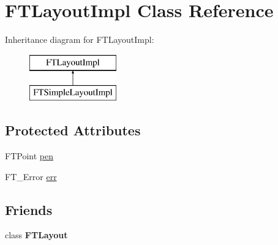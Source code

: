 \hypertarget{class_f_t_layout_impl}{\section{F\-T\-Layout\-Impl Class Reference}
\label{class_f_t_layout_impl}
}
Inheritance diagram for F\-T\-Layout\-Impl\-:\begin{figure}[H]
\begin{center}
\leavevmode
\includegraphics[height=2.000000cm]{class_f_t_layout_impl}
\end{center}
\end{figure}
\subsection*{Protected Attributes}
\begin{DoxyCompactItemize}
\item 
F\-T\-Point \hyperlink{class_f_t_layout_impl_aefaff875c0cf4fe5710897f614be44ac}{pen}
\item 
F\-T\-\_\-\-Error \hyperlink{class_f_t_layout_impl_af3c9ad6d6636a69a6643d68383e4edcd}{err}
\end{DoxyCompactItemize}
\subsection*{Friends}
\begin{DoxyCompactItemize}
\item 
\hypertarget{class_f_t_layout_impl_a28e6cd087379e90923b29b9c2c103aa8}{class {\bfseries F\-T\-Layout}}\label{class_f_t_layout_impl_a28e6cd087379e90923b29b9c2c103aa8}

\end{DoxyCompactItemize}


